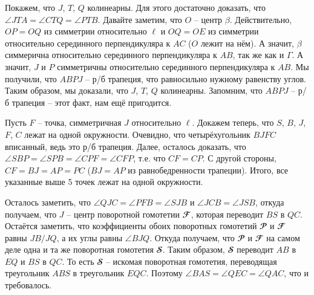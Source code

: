 \documentclass[14pt]{extarticle}
\newcommand{\F}{\mathbfcal{F}}
\renewcommand{\P}{\mathbfcal{P}}
\renewcommand{\S}{\mathbfcal{S}}
\begin{document}
Покажем, что \(J\), \(T\), \(Q\) колинеарны. 
Для этого достаточно доказать, что 
\(\angle JTA = \angle CTQ = \angle PTB\).
Давайте заметим, что \(O\) -- центр \(\beta\). Действительно, 
\(OP = OQ\) из симметрии относительно \(\ell\) и \(OQ = OE\) 
из симметрии относительно серединного перпендикуляра к \(AC\) 
(\(O\) лежит на нём). А значит, \(\beta\) симмерична 
относительно серединного перпендикуляра к \(AB\), так же как и 
\(\Gamma\). А значит, \(J\) и \(P\) симметричны относительно 
серединного перпендикуляра к \(AB\). Мы получили, что 
\(ABPJ\) -- р/б трапеция, что равносильно нужному равенству углов. 
Таким образом, мы доказали, что \(J\), \(T\), \(Q\) колинеарны.
Запомним, что \(ABPJ\) -- р/б трапеция -- этот факт, нам ещё 
пригодится.

Пусть \(F\) -- точка, симметричная \(J\) относительно \(\ell\). 
Докажем теперь, что \(S\), \(B\), \(J\), \(F\), \(C\) лежат на 
одной окружности. Очевидно, что четырёхугольник \(BJFC\) 
вписанный, ведь это 
р/б трапеция. Далее, осталось доказать, что \(\angle SBP = 
\angle SPB = \angle CPF = \angle CFP\), т.е. что \(CF = CP\).
С другой стороны, \(CF = BJ = AP = PC\) (\(BJ = AP\) из равнобедренности 
трапеции). Итого, все указанные выше 5 точек лежат на одной 
окружности.%

Осталось заметить, что \(\angle QJC = \angle PFB = \angle SJB\) и
\(\angle JCB = \angle JSB\), откуда получаем, что \(J\) -- 
центр поворотной гомотетии \(\F\), которая переводит \(BS\) в 
\(QC\). Остаётся заметить, что коэффициенты обоих поворотных 
гомотетий 
\(\P\) и \(\F\) равны \(JB/JQ\), а их углы равны \(\angle BJQ\).
Откуда получаем, что \(\P\) и \(\F\) на самом деле одна и та же 
поворотная гомотетия \(\S\). Таким образом, \(\S\) переводит \(AB\) в \(EQ\) 
и \(BS\) в \(QC\). То есть \(\S\) -- искомая поворотная гомотетия, 
переводящая треугольник \(ABS\) в треугольник \(EQC\). Поэтому 
\(\angle BAS = \angle QEC = \angle QAC\), что и требовалось.
\end{document}
